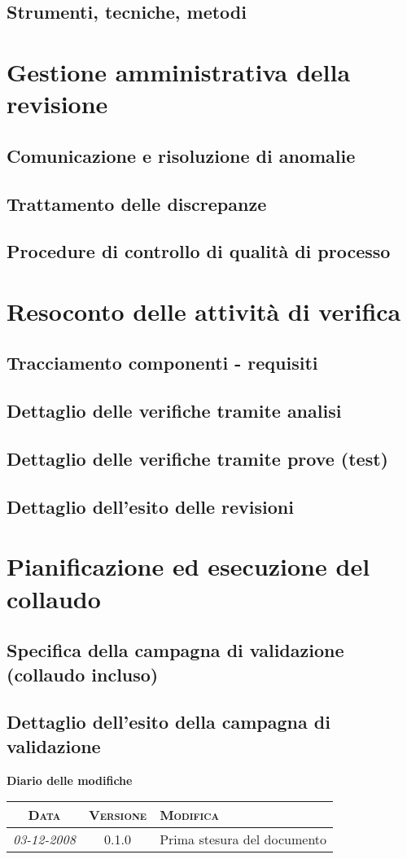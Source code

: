 \documentclass[11pt,a4paper]{article}
\newcommand{\modifiche} 
{
\newpage
\begin{center}
\textbf{Diario delle modifiche} \\
\bigskip
\begin{tabular}{|c|c|p{0.51\textwidth}|}
\hline
\textsc{Data} & \textsc{Versione} & \textsc{Modifica} \\
\hline
\hline
\textit{03-12-2008} & 0.1.0 & Prima stesura del documento \\
\hline
\end{tabular}
\end{center}
}
\begin{document}
	\subsection{Strumenti, tecniche, metodi}
\section{Gestione amministrativa della revisione}
	\subsection{Comunicazione e risoluzione di anomalie}
	\subsection{Trattamento delle discrepanze}
	\subsection{Procedure di controllo di qualità di processo}
\section{Resoconto delle attività di verifica}
	\subsection{Tracciamento componenti - requisiti}
	\subsection{Dettaglio delle verifiche tramite analisi}
	\subsection{Dettaglio delle verifiche tramite prove (test)}
	\subsection{Dettaglio dell'esito delle revisioni}
\section{Pianificazione ed esecuzione del collaudo}
	\subsection{Specifica della campagna di validazione (collaudo incluso)}
	\subsection{Dettaglio dell'esito della campagna di validazione}
\modifiche
\end{document}
